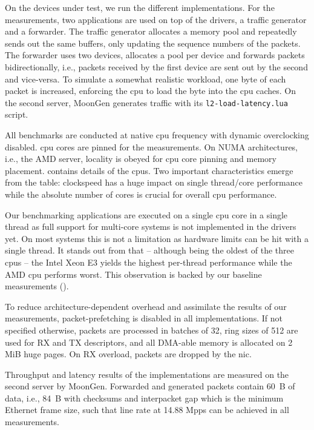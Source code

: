 On the devices under test, we run the different implementations. For the
measurements, two applications are used on top of the drivers, a traffic
generator and a forwarder. The traffic generator allocates a memory pool and
repeatedly sends out the same buffers, only updating the sequence numbers of the
packets. The forwarder uses two devices, allocates a pool per device and
forwards packets bidirectionally, i.e., packets received by the first device are
sent out by the second and vice-versa. To simulate a somewhat realistic
workload, one byte of each packet is increased, enforcing the \ac{cpu} to load
the byte into the \ac{cpu} caches. On the second server, MoonGen
\cite{emmerich2015moongen} generates traffic with its
\texttt{l2-load-latency.lua} script.

All benchmarks are conducted at native \ac{cpu} frequency with dynamic
overclocking disabled. \ac{cpu} cores are pinned for the measurements. On NUMA
architectures, i.e., the AMD server, locality is obeyed for \ac{cpu} core
pinning and memory placement.  contains details of the \acp{cpu}.
Two important characteristics emerge from the table: clockspeed has a huge
impact on single thread/core performance while the absolute number of cores is
crucial for overall \ac{cpu} performance.

Our benchmarking applications are executed on a single \ac{cpu} core in a single
thread as full support for multi-core systems is not implemented in the drivers
yet. On most systems this is not a limitation as hardware limits can be hit with
a single thread. It stands out from  that -- although being the
oldest of the three \acp{cpu} -- the Intel Xeon E3 yields the highest per-thread
performance while the AMD \ac{cpu} performs worst. This observation is backed by
our baseline measurements ().

To reduce architecture-dependent overhead and assimilate the results of our
measurements, packet-prefetching is disabled in all implementations. If not
specified otherwise, packets are processed in batches of 32, ring sizes of 512
are used for RX and TX descriptors, and all DMA-able memory is allocated on 2
MiB huge pages. On RX overload, packets are dropped by the \ac{nic}.

Throughput and latency results of the implementations are measured on the second
server by MoonGen. Forwarded and generated packets contain 60~B of data, i.e.,
84~B with checksums and interpacket gap which is the minimum Ethernet frame
size, such that line rate at 14.88 Mpps can be achieved in all measurements.

